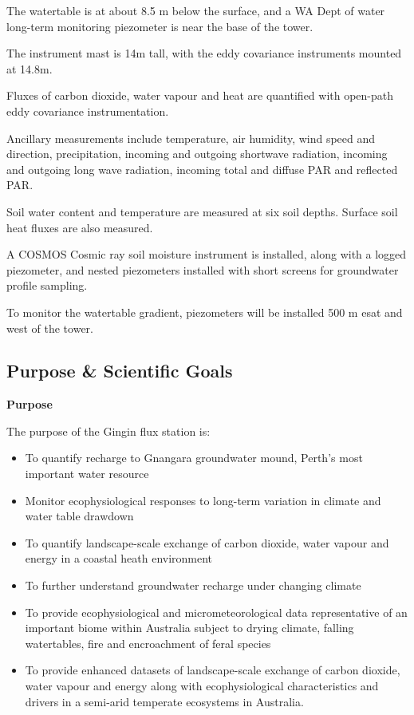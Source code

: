 \documentclass[11pt,a4paper]{article}
\begin{document}
The watertable is at about 8.5 m below the surface, and a WA Dept of water long-term monitoring piezometer is near the base of the tower.

The instrument mast is 14m tall, with the eddy covariance instruments mounted at 14.8m.

Fluxes of carbon dioxide, water vapour and heat  are quantified with open-path eddy covariance instrumentation.

Ancillary measurements include temperature, air  humidity, wind speed and direction, precipitation, incoming and outgoing  shortwave radiation, incoming and outgoing long wave radiation, incoming total  and diffuse PAR and reflected PAR.

Soil water content and temperature are measured  at six soil depths.  Surface soil heat fluxes are also measured.

A COSMOS Cosmic ray soil moisture instrument is  installed, along with a logged piezometer, and nested piezometers installed  with short screens for groundwater profile sampling.

To monitor the watertable gradient, piezometers will be installed 500 m esat and west of the tower.

\subsection*{Purpose \& Scientific Goals}

\textbf{Purpose}

The purpose of the Gingin   flux station is:

\begin{itemize}
  \item To quantify recharge to Gnangara groundwater  mound, Perth’s most important water resource
  \item Monitor ecophysiological responses to long-term  variation in climate and water table drawdown
  \item To quantify landscape-scale exchange of carbon  dioxide, water vapour and energy in a coastal heath environment
  \item To further understand groundwater recharge under  changing climate
  \item To provide ecophysiological and  micrometeorological data representative of an important biome within Australia  subject to drying climate, falling watertables, fire and encroachment of feral  species
  \item To provide enhanced datasets of landscape-scale  exchange of carbon dioxide, water vapour and energy along with ecophysiological  characteristics and drivers in a semi-arid temperate ecosystems in Australia.
\end{itemize}
\end{document}
